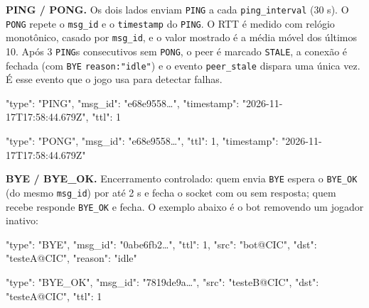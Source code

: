 \documentclass[11pt,a4paper]{article}
\begin{document}
\textbf{PING / PONG.} Os dois lados enviam \texttt{PING} a cada \texttt{ping\_interval} (30 s). O \texttt{PONG} repete o \texttt{msg\_id} e o \texttt{timestamp} do \texttt{PING}. O RTT é medido com relógio monotônico, casado por \texttt{msg\_id}, e o valor mostrado é a média móvel dos últimos 10. Após 3 \texttt{PING}s consecutivos sem \texttt{PONG}, o peer é marcado \texttt{STALE}, a conexão é fechada (com \texttt{BYE} \texttt{reason:"idle"}) e o evento \texttt{peer\_stale} dispara uma única vez. É esse evento que o jogo usa para detectar falhas.
\begin{codigo}
{
  "type": "PING",
  "msg_id": "e68e9558…",
  "timestamp": "2026-11-17T17:58:44.679Z",
  "ttl": 1
}
\end{codigo}
\begin{codigo}
{
  "type": "PONG",
  "msg_id": "e68e9558…",
  "ttl": 1,
  "timestamp": "2026-11-17T17:58:44.679Z"
}
\end{codigo}
\textbf{BYE / BYE\_OK.} Encerramento controlado: quem envia \texttt{BYE} espera o \texttt{BYE\_OK} (do mesmo \texttt{msg\_id}) por até 2 s e fecha o socket com ou sem resposta; quem recebe responde \texttt{BYE\_OK} e fecha. O exemplo abaixo é o bot removendo um jogador inativo:
\begin{codigo}
{
  "type": "BYE",
  "msg_id": "0abe6fb2…",
  "ttl": 1,
  "src": "bot@CIC",
  "dst": "testeA@CIC",
  "reason": "idle"
}
\end{codigo}
\begin{codigo}
{
  "type": "BYE_OK",
  "msg_id": "7819de9a…",
  "src": "testeB@CIC",
  "dst": "testeA@CIC",
  "ttl": 1
}
\end{codigo}
\end{document}

